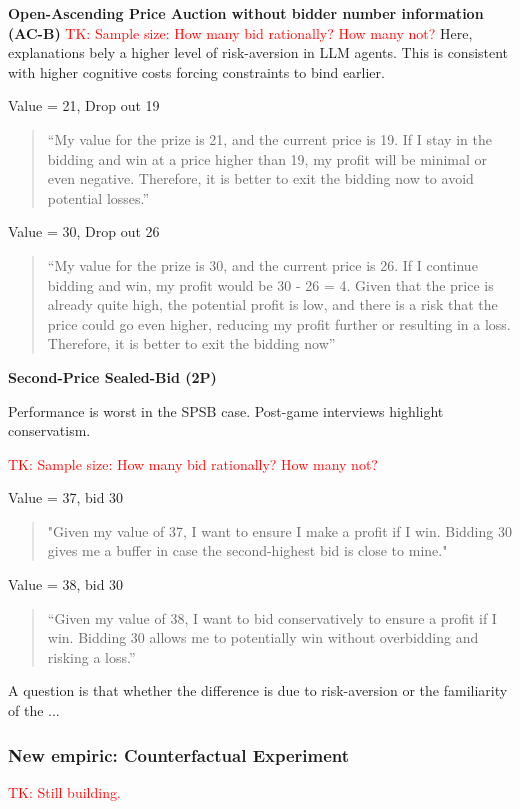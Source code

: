 \documentclass{article} %
\newcommand{\TK}[1]{\textcolor{red}{TK: #1}}
\begin{document}
\textbf{Open-Ascending Price Auction without bidder number information (AC-B)}
\TK{Sample size: 
How many bid rationally?
How many not?}
Here, explanations bely a higher level of risk-aversion in LLM agents. 
This is consistent with higher cognitive costs forcing constraints to bind earlier.

Value = 21,  Drop out 19
\begin{quote}
    “My value for the prize is 21, and the current price is 19. If I stay in the bidding and win at a price higher than 19, my profit will be minimal or even negative. Therefore, it is better to exit the bidding now to avoid potential losses.”
\end{quote}

Value = 30,  Drop out 26
\begin{quote}
“My value for the prize is 30, and the current price is 26. If I continue bidding and win, my profit would be 30 - 26 = 4. Given that the price is already quite high, the potential profit is low, and there is a risk that the price could go even higher, reducing my profit further or resulting in a loss. Therefore, it is better to exit the bidding now”
\end{quote}


\textbf{Second-Price Sealed-Bid (2P)}

Performance is worst in the SPSB case. 
Post-game interviews highlight conservatism.

\TK{Sample size: 
How many bid rationally?
How many not?}


Value = 37, bid 30
\begin{quote}
    "Given my value of 37, I want to ensure I make a profit if I win. Bidding 30 gives me a buffer in case the second-highest bid is close to mine."
\end{quote}

Value = 38, bid 30
\begin{quote}
    “Given my value of 38, I want to bid conservatively to ensure a profit if I win. Bidding 30 allows me to potentially win without overbidding and risking a loss.”
\end{quote}

A question is that whether the difference is due to risk-aversion or the familiarity of the ...


\subsubsection{New empiric: Counterfactual Experiment}
\TK{Still building.}
\end{document}
